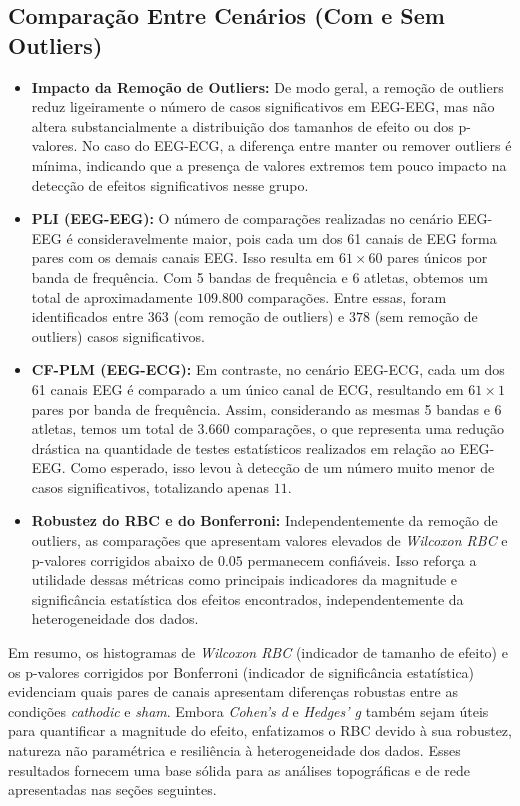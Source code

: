 \subsection{Comparação Entre Cenários (Com e Sem Outliers)}
\begin{itemize}
    \item \textbf{Impacto da Remoção de Outliers:} De modo geral, a remoção de outliers reduz ligeiramente o número de casos significativos em EEG-EEG, mas não altera substancialmente a distribuição dos tamanhos de efeito ou dos p-valores. No caso do EEG-ECG, a diferença entre manter ou remover outliers é mínima, indicando que a presença de valores extremos tem pouco impacto na detecção de efeitos significativos nesse grupo.

    \item \textbf{PLI (EEG-EEG):} O número de comparações realizadas no cenário EEG-EEG é consideravelmente maior, pois cada um dos 61 canais de EEG forma pares com os demais canais EEG. Isso resulta em \( 61 \times 60 \) pares únicos por banda de frequência. Com 5 bandas de frequência e 6 atletas, obtemos um total de aproximadamente \( 109.800 \) comparações. Entre essas, foram identificados entre \( 363 \) (com remoção de outliers) e \( 378 \) (sem remoção de outliers) casos significativos.

    \item \textbf{CF-PLM (EEG-ECG):} Em contraste, no cenário EEG-ECG, cada um dos 61 canais EEG é comparado a um único canal de ECG, resultando em \( 61 \times 1 \) pares por banda de frequência. Assim, considerando as mesmas 5 bandas e 6 atletas, temos um total de \( 3.660 \) comparações, o que representa uma redução drástica na quantidade de testes estatísticos realizados em relação ao EEG-EEG. Como esperado, isso levou à detecção de um número muito menor de casos significativos, totalizando apenas \( 11 \).

    \item \textbf{Robustez do RBC e do Bonferroni:} Independentemente da remoção de outliers, as comparações que apresentam valores elevados de \emph{Wilcoxon RBC} e p-valores corrigidos abaixo de \( 0.05 \) permanecem confiáveis. Isso reforça a utilidade dessas métricas como principais indicadores da magnitude e significância estatística dos efeitos encontrados, independentemente da heterogeneidade dos dados.
\end{itemize}

Em resumo, os histogramas de \emph{Wilcoxon RBC} (indicador de tamanho de efeito) e os p-valores corrigidos por Bonferroni (indicador de significância estatística) evidenciam quais pares de canais apresentam diferenças robustas entre as condições \emph{cathodic} e \emph{sham}. Embora \emph{Cohen's d} e \emph{Hedges' g} também sejam úteis para quantificar a magnitude do efeito, enfatizamos o RBC devido à sua robustez, natureza não paramétrica e resiliência à heterogeneidade dos dados. Esses resultados fornecem uma base sólida para as análises topográficas e de rede apresentadas nas seções seguintes.

